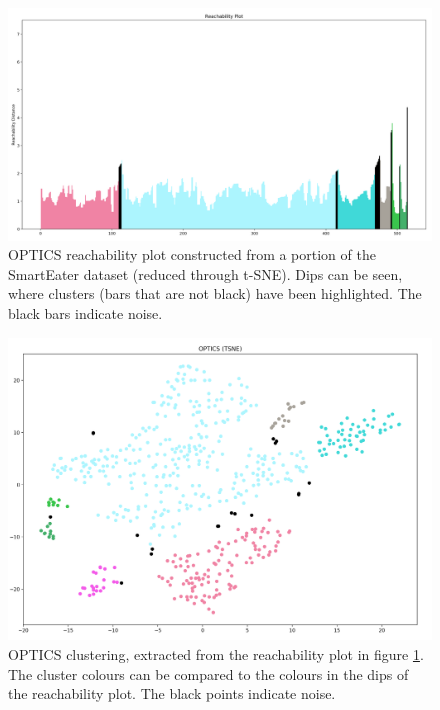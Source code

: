 \begin{figure}
  \centering
  \includegraphics[width=1\textwidth]{./images/OPTICS/1h-1-example-reachabilityPlot-DBSCAN-zoom.png}
  \caption{OPTICS reachability plot constructed from a portion of the SmartEater dataset (reduced through t-SNE). Dips can be seen, where clusters (bars that are not black) have been highlighted. The black bars indicate noise.}
  \label{figure:1h-1-example-reachabilityPlot-DBSCAN-zoom}
\end{figure}

\begin{figure}
  \centering
  \includegraphics[width=1\textwidth]{./images/OPTICS/1h-1-example-OPTICS-DBSCAN-zoom.png}
  \caption{OPTICS clustering, extracted from the reachability plot in figure \ref{figure:1h-1-example-reachabilityPlot-DBSCAN-zoom}. The cluster colours can be compared to the colours in the dips of the reachability plot. The black points indicate noise.}
  \label{figure:1h-1-example-OPTICS-DBSCAN-zoom}
\end{figure}



